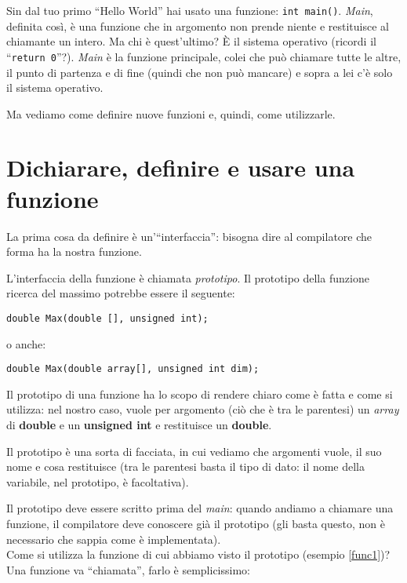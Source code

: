 Sin dal tuo primo ``Hello World'' hai usato una funzione: \verb|int main()|. \emph{Main}, definita così, è una funzione che in argomento non prende niente e restituisce al chiamante un intero. Ma chi è quest'ultimo? È il sistema operativo (ricordi il ``\verb|return 0|''?). \emph{Main} è la funzione principale, colei che può chiamare tutte le altre, il punto di partenza e di fine (quindi che non può mancare) e sopra a lei c'è solo il sistema operativo.

Ma vediamo come definire nuove funzioni e, quindi, come utilizzarle.
\section{Dichiarare, definire e usare una funzione}
La prima cosa da definire è un'``interfaccia'': bisogna dire al compilatore che forma ha la nostra funzione. 

L'interfaccia della funzione è chiamata \emph{prototipo}. Il prototipo della funzione ricerca del massimo potrebbe essere il seguente:
\begin{lstlisting}
double Max(double [], unsigned int);
\end{lstlisting}
o anche:
\begin{lstlisting}[label=func1]
double Max(double array[], unsigned int dim);
\end{lstlisting}

Il prototipo di una funzione ha lo scopo di rendere chiaro come è fatta e come si utilizza: nel nostro caso, vuole per argomento (ciò che è tra le parentesi) un \emph{array} di \textbf{double} e un \textbf{unsigned int} e restituisce un \textbf{double}.

Il prototipo è una sorta di facciata, in cui vediamo che argomenti vuole, il suo nome e cosa restituisce (tra le parentesi basta il tipo di dato: il nome della variabile, nel prototipo, è facoltativa). 

Il prototipo deve essere scritto prima del \emph{main}: quando andiamo a chiamare una funzione, il compilatore deve conoscere già il prototipo (gli basta questo, non è necessario che sappia come è implementata).\\


Come si utilizza la funzione di cui abbiamo visto il prototipo (esempio \ref{func1})? Una funzione va ``chiamata'', farlo è semplicissimo:

